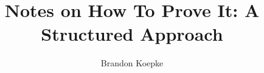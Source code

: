 \usepackage{savetrees}
\usepackage{amsmath}
\usepackage{amsfonts}
\title{Notes on How To Prove It: A Structured Approach}
\author{Brandon Koepke}
